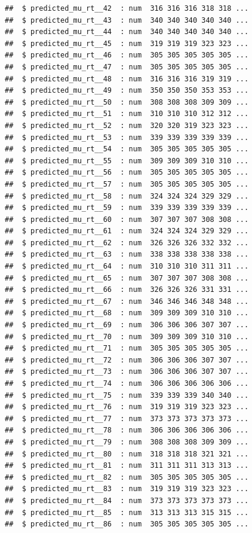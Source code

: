 \documentclass{article}\usepackage[]{graphicx}\usepackage[]{color}
\makeatletter
\newenvironment{kframe}{%
 \def\at@end@of@kframe{}%
 \ifinner\ifhmode%
  \def\at@end@of@kframe{\end{minipage}}%
  \begin{minipage}{\columnwidth}%
 \fi\fi%
 \def\FrameCommand##1{\hskip\@totalleftmargin \hskip-\fboxsep
 \colorbox{shadecolor}{##1}\hskip-\fboxsep
     \hskip-\linewidth \hskip-\@totalleftmargin \hskip\columnwidth}%
 \MakeFramed {\advance\hsize-\width
   \@totalleftmargin\z@ \linewidth\hsize
   \@setminipage}}%
 {\par\unskip\endMakeFramed%
 \at@end@of@kframe}
\newenvironment{knitrout}{}{} %
\makeatother
\begin{document}
\begin{knitrout}
\begin{kframe}
\begin{verbatim}
##  $ predicted_mu_rt__42  : num  316 316 316 318 318 ...
##  $ predicted_mu_rt__43  : num  340 340 340 340 340 ...
##  $ predicted_mu_rt__44  : num  340 340 340 340 340 ...
##  $ predicted_mu_rt__45  : num  319 319 319 323 323 ...
##  $ predicted_mu_rt__46  : num  305 305 305 305 305 ...
##  $ predicted_mu_rt__47  : num  305 305 305 305 305 ...
##  $ predicted_mu_rt__48  : num  316 316 316 319 319 ...
##  $ predicted_mu_rt__49  : num  350 350 350 353 353 ...
##  $ predicted_mu_rt__50  : num  308 308 308 309 309 ...
##  $ predicted_mu_rt__51  : num  310 310 310 312 312 ...
##  $ predicted_mu_rt__52  : num  320 320 319 323 323 ...
##  $ predicted_mu_rt__53  : num  339 339 339 339 339 ...
##  $ predicted_mu_rt__54  : num  305 305 305 305 305 ...
##  $ predicted_mu_rt__55  : num  309 309 309 310 310 ...
##  $ predicted_mu_rt__56  : num  305 305 305 305 305 ...
##  $ predicted_mu_rt__57  : num  305 305 305 305 305 ...
##  $ predicted_mu_rt__58  : num  324 324 324 329 329 ...
##  $ predicted_mu_rt__59  : num  339 339 339 339 339 ...
##  $ predicted_mu_rt__60  : num  307 307 307 308 308 ...
##  $ predicted_mu_rt__61  : num  324 324 324 329 329 ...
##  $ predicted_mu_rt__62  : num  326 326 326 332 332 ...
##  $ predicted_mu_rt__63  : num  338 338 338 338 338 ...
##  $ predicted_mu_rt__64  : num  310 310 310 311 311 ...
##  $ predicted_mu_rt__65  : num  307 307 307 308 308 ...
##  $ predicted_mu_rt__66  : num  326 326 326 331 331 ...
##  $ predicted_mu_rt__67  : num  346 346 346 348 348 ...
##  $ predicted_mu_rt__68  : num  309 309 309 310 310 ...
##  $ predicted_mu_rt__69  : num  306 306 306 307 307 ...
##  $ predicted_mu_rt__70  : num  309 309 309 310 310 ...
##  $ predicted_mu_rt__71  : num  305 305 305 305 305 ...
##  $ predicted_mu_rt__72  : num  306 306 306 307 307 ...
##  $ predicted_mu_rt__73  : num  306 306 306 307 307 ...
##  $ predicted_mu_rt__74  : num  306 306 306 306 306 ...
##  $ predicted_mu_rt__75  : num  339 339 339 340 340 ...
##  $ predicted_mu_rt__76  : num  319 319 319 323 323 ...
##  $ predicted_mu_rt__77  : num  373 373 373 373 373 ...
##  $ predicted_mu_rt__78  : num  306 306 306 306 306 ...
##  $ predicted_mu_rt__79  : num  308 308 308 309 309 ...
##  $ predicted_mu_rt__80  : num  318 318 318 321 321 ...
##  $ predicted_mu_rt__81  : num  311 311 311 313 313 ...
##  $ predicted_mu_rt__82  : num  305 305 305 305 305 ...
##  $ predicted_mu_rt__83  : num  319 319 319 323 323 ...
##  $ predicted_mu_rt__84  : num  373 373 373 373 373 ...
##  $ predicted_mu_rt__85  : num  313 313 313 315 315 ...
##  $ predicted_mu_rt__86  : num  305 305 305 305 305 ...

\end{verbatim}
\end{kframe}
\end{knitrout}
\end{document}
